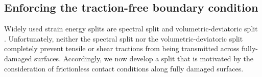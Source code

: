 \subsection{Enforcing the traction-free boundary condition}
\label{section: Chapter4/theory/contact_split}

Widely used strain energy splits are spectral split \cite{miehe_2010_p1, miehe_2010_p2} and volumetric-deviatoric split \cite{amor_2009}.  Unfortunately, neither the spectral split nor the volumetric-deviatoric split completely prevent tensile or shear tractions from being transmitted across fully-damaged surfaces.  Accordingly, we now develop a split that is motivated by the consideration of frictionless contact conditions along fully damaged surfaces.


